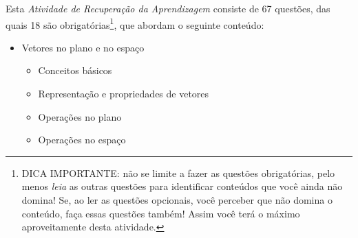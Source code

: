 \documentclass[pdftex, brazil, 12pt, oneside, addpoints]{exam}
\begin{document}
\newpage



\vspace{0.5cm}



Esta \emph{Atividade de Recuperação da Aprendizagem} consiste de
67 questões, das quais 18 são obrigatórias\footnote{DICA IMPORTANTE:
  não se limite a fazer as questões obrigatórias, pelo menos \emph{leia} as
  outras questões para identificar conteúdos que você ainda não
  domina! Se, ao ler as questões opcionais, você perceber que não
  domina o conteúdo, faça essas questões também! Assim você terá o
  máximo aproveitamente desta atividade.}, que abordam o seguinte conteúdo:

\begin{itemize}
\item Vetores no plano e no espaço
  \begin{itemize}
  \item Conceitos básicos
  \item Representação e propriedades de vetores
  \item Operações no plano
  \item Operações no espaço
  \end{itemize}
\end{itemize}

\begin{center}
\end{center}
\end{document}
